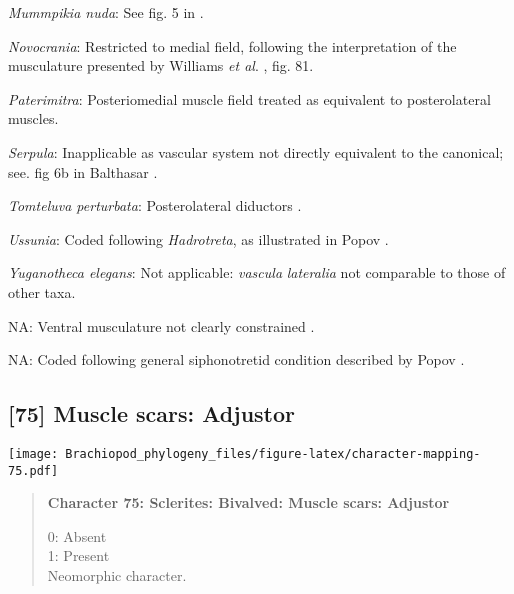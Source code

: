 \documentclass[openany]{book}
\theoremstyle{definition}
\theoremstyle{definition}
\theoremstyle{definition}
\theoremstyle{remark}
\begin{document}
\hypertarget{Mummpikia_nuda-coding-74}{}
\emph{Mummpikia nuda}: See fig. 5 in \citet{Holmer1997EarlyCambrian}.

\hypertarget{Novocrania-coding-74}{}
\emph{Novocrania}: Restricted to medial field, following the
interpretation of the musculature presented by Williams \emph{et al}.
\citeyearpar{Williams2000LinguliformeaCraniiformea}, fig. 81.

\hypertarget{Paterimitra-coding-74}{}
\emph{Paterimitra}: Posteriomedial muscle field \citep[text-fig.
6]{Williams1998Thediversity} treated as equivalent to posterolateral
muscles.

\hypertarget{Serpula-coding-74}{}
\emph{Serpula}: Inapplicable as vascular system not directly equivalent
to the canonical; see. fig 6b in Balthasar
\citeyearpar{Balthasar2009Thebrachiopod}.

\hypertarget{Tomteluva_perturbata-coding-74}{}
\emph{Tomteluva perturbata}: Posterolateral diductors \citep[fig. 18.2
in][]{Bassett2001Functionalmorphology}.

\hypertarget{Ussunia-coding-74}{}
\emph{Ussunia}: Coded following \emph{Hadrotreta}, as illustrated in
Popov \citeyearpar{Popov1992TheCambrian}.

\hypertarget{Yuganotheca_elegans-coding-74}{}
\emph{Yuganotheca elegans}: Not applicable: \emph{vascula}
\emph{lateralia} not comparable to those of other taxa.

\hypertarget{NA-coding-74}{}
NA: Ventral musculature not clearly constrained
\citep{Holmer2009Theenigmatic}.

\hypertarget{NA-coding-74}{}
NA: Coded following general siphonotretid condition described by Popov
\citeyearpar[p.~407]{Popov1992TheCambrian}.

\subsection*{{[}75{]} Muscle scars:
Adjustor}\label{muscle-scars-adjustor}

\texttt{[image: Brachiopod\_phylogeny\_files/figure-latex/character-mapping-75.pdf]}

\begin{quote}
\textbf{Character 75: Sclerites: Bivalved: Muscle scars: Adjustor}

0: Absent\\
1: Present\\
Neomorphic character.
\end{quote}
\end{document}
